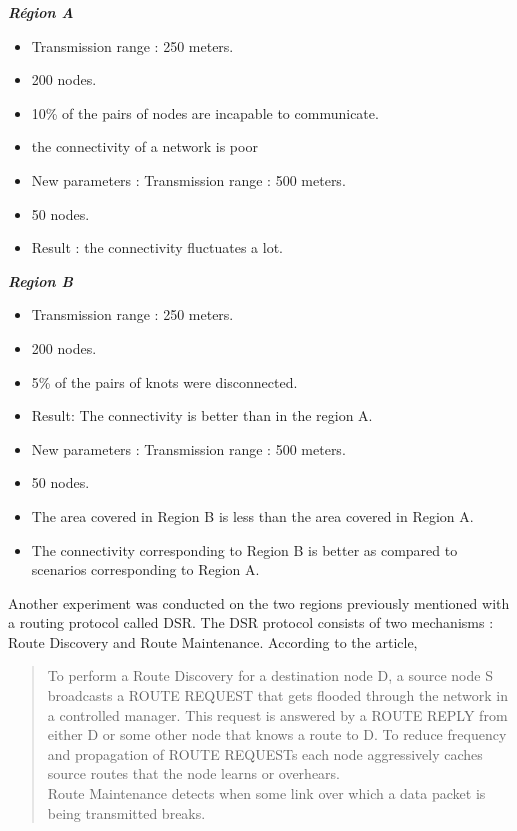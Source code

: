 \begin{multicols}{2}
\textit{\textbf{Région A}}
\begin{itemize}
\item Transmission range : 250 meters.
\item 200 nodes.
\item 10\% of the pairs of nodes are incapable to communicate.
\item the connectivity of a network is poor
\item New parameters : Transmission range : 500 meters.
\item 50 nodes.
\item Result : the connectivity fluctuates a lot.
\end{itemize}
\columnbreak
\textit{\textbf{Region B}}
\begin{itemize}
\item Transmission range : 250 meters.
\item 200 nodes.
\item 5\% of the pairs of knots were disconnected.
\item Result: The connectivity is better than in the region A.
\item New parameters : Transmission range : 500 meters.
\item 50 nodes.
\item The area covered in Region B is less than the area covered in Region A.
\item The connectivity corresponding to Region B is better as compared to scenarios corresponding to Region A.
\end{itemize}
\end{multicols}


Another experiment was conducted on the two regions previously mentioned with a routing protocol called DSR. The DSR protocol consists of two mechanisms : Route Discovery and Route Maintenance. According to the article, 
\begin{quotation}
To perform a Route Discovery for a destination node D, a source node S broadcasts a ROUTE REQUEST that gets flooded through the network in a controlled manager. This request is answered by a ROUTE REPLY from either D or some other node that knows a route to D. To reduce frequency and propagation of ROUTE REQUESTs each node aggressively caches source routes that the node learns or overhears.\\
Route Maintenance detects when some link over which a data packet is being transmitted breaks\cite{VehicularAdHocNetworks9}.
\end{quotation}


